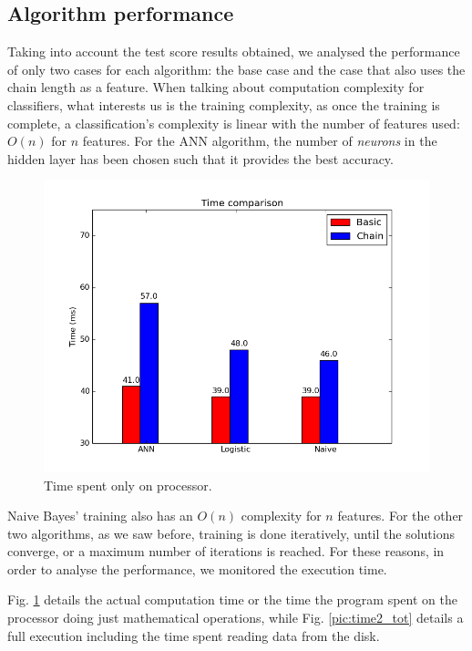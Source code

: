 \subsection{Algorithm performance}

Taking into account the test score results obtained, we analysed the performance of only two cases for each algorithm: the base case and the case that also uses the chain length as a feature. When talking about computation complexity for classifiers, what interests us is the training complexity, as once the training is complete, a classification's complexity is linear with the number of features used: $O(n)$ for $n$ features. For the ANN algorithm, the number of \textit{neurons} in the hidden layer has been chosen such that it provides the best accuracy. 

\begin{figure}[h]
	\begin{center}
		\includegraphics[scale=0.6]{figures/time1_tot.png}
	\end{center}
	
	\caption{Time spent only on processor.}
	\label{pic:time1_tot}

\end{figure}

Naive Bayes' training also has an $O(n)$ complexity for $n$ features. For the other two algorithms, as we saw before, training is done iteratively, until the solutions converge, or a maximum number of iterations is reached. For these reasons, in order to analyse the performance, we monitored the execution time.

Fig. \ref{pic:time1_tot} details the actual computation time or the time the program spent on the processor doing just mathematical operations, while Fig. \ref{pic:time2_tot} details a full execution including the time spent reading data from the disk. 


